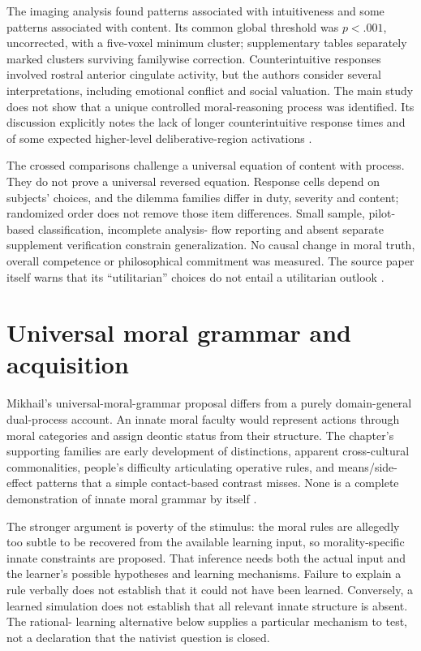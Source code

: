 The imaging analysis found patterns associated with intuitiveness and
some patterns associated with content. Its common global threshold was
\(p<.001\), uncorrected, with a five-voxel minimum cluster; supplementary
tables separately marked clusters surviving familywise correction.
Counterintuitive responses involved rostral anterior cingulate activity,
but the authors consider several interpretations, including emotional
conflict and social valuation. The main study does not show that a unique
controlled moral-reasoning process was identified. Its discussion explicitly
notes the lack of longer counterintuitive response times and of some
expected higher-level deliberative-region activations
\parencite[pp.~395--400]{KahaneEtAl2012IntuitivenessR123}.

The crossed comparisons challenge a universal equation of content with
process. They do not prove a universal reversed equation. Response cells
depend on subjects' choices, and the dilemma families differ in duty,
severity and content; randomized order does not remove those item
differences. Small sample, pilot-based classification, incomplete analysis-
flow reporting and absent separate supplement verification constrain
generalization. No causal change in moral truth, overall competence or
philosophical commitment was measured. The source paper itself warns
that its ``utilitarian'' choices do not entail a utilitarian outlook
\parencite[pp.~395,399--401]{KahaneEtAl2012IntuitivenessR123}.

\section{Universal moral grammar and acquisition}
\label{sec:p11-r123-grammar}

Mikhail's universal-moral-grammar proposal differs from a purely
domain-general dual-process account. An innate moral faculty would
represent actions through moral categories and assign deontic status
from their structure. The chapter's supporting families are early
development of distinctions, apparent cross-cultural commonalities,
people's difficulty articulating operative rules, and means/side-effect
patterns that a simple contact-based contrast misses. None is a complete
demonstration of innate moral grammar by itself
\parencite[pp.~702--703]{WiegmannSauer2021MoralJudgment}.

The stronger argument is poverty of the stimulus: the moral rules are
allegedly too subtle to be recovered from the available learning input,
so morality-specific innate constraints are proposed. That inference needs
both the actual input and the learner's possible hypotheses and learning
mechanisms. Failure to explain a rule verbally does not establish that
it could not have been learned. Conversely, a learned simulation does
not establish that all relevant innate structure is absent. The rational-
learning alternative below supplies a particular mechanism to test,
not a declaration that the nativist question is closed.

